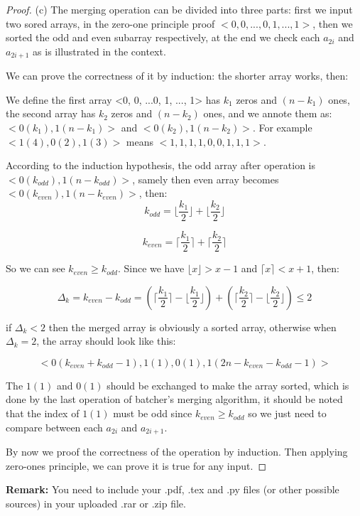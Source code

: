 \documentclass[12pt,a4paper]{article}
\theoremstyle{definition}
\begin{document}
\begin{enumerate}
\begin{proof}
	(c) The merging operation can be divided into three parts: first we input two sored arrays, in the zero-one principle proof $<0, 0, ..., 0, 1, ..., 1>$, then we 
	sorted the odd and even subarray respectively, at the end we check each $a_{2i}$ and $a_{2i+1}$ as is illustrated in the context.
	
	We can prove the correctness of it by induction: the shorter array works, then:

	We define the first array <0, 0, ...0, 1, ..., 1> has $k_1$ zeros and $(n - k_1)$ ones, the second array has $k_2$ zeros and $(n - k_2)$ ones, and we annote them as:
	$<0(k_1), 1(n - k_1)>$ and $<0(k_2), 1(n - k_2)>$. For example $<1(4), 0(2), 1(3)>$ means $<1, 1, 1, 1, 0, 0, 1, 1, 1>$.

	According to the induction hypothesis, the odd array after operation is $<0(k_{odd}), 1(n - k_{odd})>$, samely then even array becomes $<0(k_{even}), 1(n - k_{even})>$, then:
	\begin{equation*}
        k_{odd} = \lfloor  \frac{k_1}{2}  \rfloor + \lfloor  \frac{k_2}{2} \rfloor
	\end{equation*}

	\begin{equation*}
        k_{even} = \lceil  \frac{k_1}{2}  \rceil + \lceil \frac{k_2}{2} \rceil
	\end{equation*}
	
	So we can see $k_{even} \geq k_{odd}$. Since we have $\lfloor x \rfloor > x - 1$ and $\lceil x \rceil < x + 1$, then:
	
	\begin{equation*}
       \Delta_{k} = k_{even} - k_{odd} = (\lceil \frac{k_1}{2}  \rceil - \lfloor  \frac{k_1}{2}  \rfloor) + (\lceil \frac{k_2}{2}  \rceil - \lfloor \frac{k_2}{2} \rfloor) \leq 2
	\end{equation*}
	
	if $\Delta_{k}<2$ then the merged array is obviously a sorted array, otherwise when $\Delta_{k} = 2$, the array should look like this:

	\begin{equation*}
         <0(k_{even} + k_{odd} - 1), 1(1), 0(1), 1(2n - k_{even} - k_{odd} - 1)>
	\end{equation*}
	
	The $1(1)$ and $0(1)$ should be exchanged to make the array sorted, which is done by the last operation of batcher's merging algorithm, it should be noted that the index of $1(1)$ must be 
	odd since $k_{even} \geq k_{odd}$ so we just need to compare between each $a_{2i}$ and $a_{2i+1}$.
	
	By now we proof the correctness of the operation by induction. Then applying zero-ones principle, we can prove it is true for any input.
	
\end{proof}

\end{enumerate}



\vspace{20pt}

\textbf{Remark:} You need to include your .pdf, .tex and .py files (or other possible sources) in your uploaded .rar or .zip file.

\end{document}
